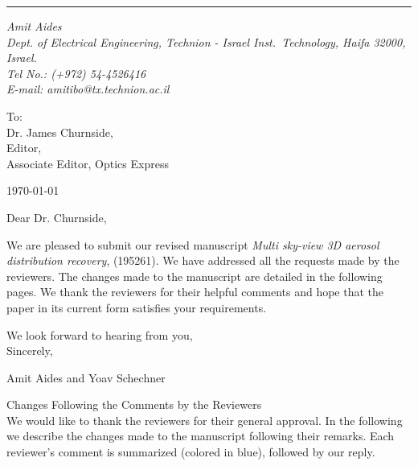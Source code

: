 \documentclass[12pt]{article}
\begin{document}

\vspace*{.5cm} \hrule

\def\sender{
  \it{Amit Aides}\\
  \scriptsize{Dept. of Electrical Engineering, Technion - Israel Inst.~Technology, Haifa 32000, Israel.}\\
  \scriptsize{Tel No.: (+972) 54-4526416}\hspace{5pt}\\
  \scriptsize{E-mail: amitibo@tx.technion.ac.il} } {\sender}

\vspace{0.5cm}
\noindent
To:\\
Dr. James Churnside,\\
Editor,\\
Associate Editor, Optics Express\\[0.6cm]

\begin{flushright}
  \today
\end{flushright}

\vspace{0.3cm} \noindent

Dear Dr. Churnside,

We are pleased to submit our revised manuscript {\em Multi sky-view 3D
  aerosol distribution recovery}, (195261).  We have addressed all the
requests made by the reviewers. The changes made to the manuscript are
detailed in the following pages. We thank the reviewers for their
helpful comments and hope that the paper in its current form satisfies
your requirements.

We look forward to hearing from you,\\

\vspace{0.2cm} Sincerely,

\vspace{0.6cm}
Amit Aides and Yoav Schechner\\

\newpage

{\Large Changes Following the Comments by the Reviewers}\\

We would like to thank the reviewers for their general approval. In
the following we describe the changes made to the manuscript following
their remarks. Each reviewer's comment is summarized (colored in
blue), followed by our reply.
\end{document}
